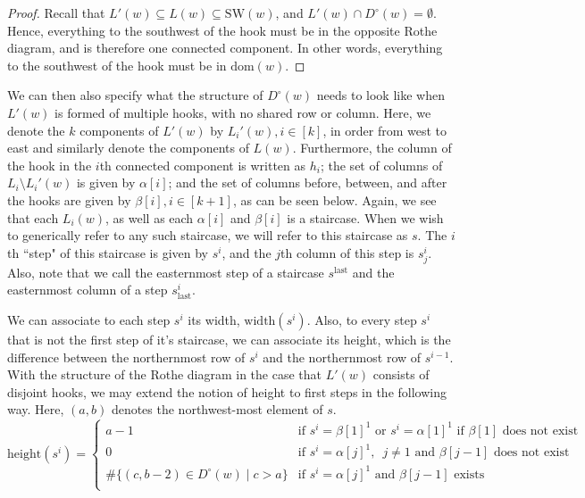 \documentclass[11pt]{amsart}
\theoremstyle{definition}
\theoremstyle{definition}
\theoremstyle{definition}
\theoremstyle{definition}
\newcommand{\SW}{\mathrm{SW}}
\newcommand{\Dc}{D^{\circ}}
\begin{document}
\begin{proof}
Recall that $L'(w) \subseteq L(w) \subseteq \SW(w)$, and $L'(w) \cap D^{\circ}(w)=\emptyset$. Hence, everything to the southwest of the hook must be in the opposite Rothe diagram, and is therefore one connected component. In other words, everything to the southwest of the hook must be in $\text{dom}(w)$.  
\end{proof}

\noindent We can then also specify what the structure of $\Dc(w)$ needs to look like when $L'(w)$ is formed of multiple hooks, with no shared row or column. 
Here, we denote the $k$ components of $L'(w)$ by $L_i'(w), i\in[k]$, in order from west to east and similarly denote the components of $L(w)$. Furthermore, the column of the hook in the $i$th connected component is written as $h_i$; the set of columns of $L_i\setminus L_i'(w)$ is given by $\alpha[i]$; and the set of columns before, between, and after the hooks are given by $\beta[i],i\in[k+1]$, as can be seen below. Again, we see that each $L_i(w)$, as well as each $\alpha[i]$ and $\beta[i]$ is a staircase.
When we wish to generically refer to any such staircase, we will refer to this staircase as $s$. The $i$th ``step" of this staircase is given by $s^i$, and the $j$th column of this step is $s^i_j$. Also, note that we call the easternmost step of a staircase $s^{\mathrm{last}}$ and
the easternmost column of a step $s^i_\mathrm{last}$. 

We can associate to each step $s^i$ its width, $\mathrm{width}(s^i)$. Also, to every step $s^i$ that is not the first step of it's staircase, we can associate
its height, which is the difference between the northernmost row of $s^i$ and the northernmost row of $s^{i-1}$.
With the structure of the Rothe diagram in the case that $L'(w)$ consists of disjoint hooks, we may extend the notion of height to first steps in the following way. Here, $(a,b)$ denotes the northwest-most element of $s$.
$$\mathrm{height}(s^i) = \begin{cases}
    a-1 & \textrm{if } s^i = \beta[1]^1 \textrm{ or } s^i = \alpha[1]^1 \textrm{ if } \beta[1] \textrm{ does not exist}\\
    0 & \textrm{if } s^i = \alpha[j]^1, \,\,\, j \neq 1 \textrm{ and } \beta[j-1] \textrm{ does not exist}\\
    \# \{ (c,b-2) \in \Dc(w) \mid c>a \} & \textrm{if } s^i = \alpha[j]^1 \textrm{ and } \beta[j-1]
   \textrm{ exists} \\
   \end{cases}
$$
\end{document}
